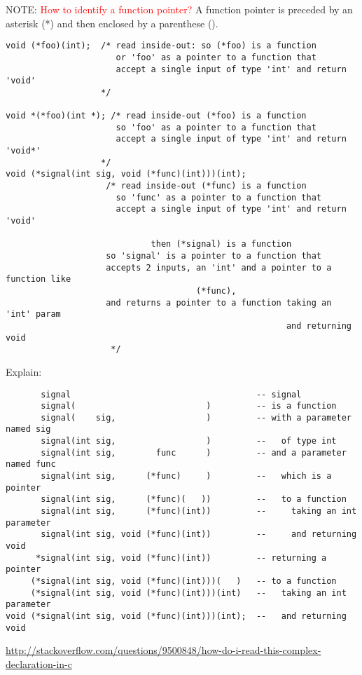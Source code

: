 NOTE: \textcolor{red}{How to identify a function pointer?} A function pointer is
preceded by an asterisk (*) and then enclosed by a parenthese ().

\begin{verbatim}
void (*foo)(int);  /* read inside-out: so (*foo) is a function
                      or 'foo' as a pointer to a function that
                      accept a single input of type 'int' and return 'void'
                   */
                   
void *(*foo)(int *); /* read inside-out (*foo) is a function 
                      so 'foo' as a pointer to a function that
                      accept a single input of type 'int' and return 'void*'
                   */                    
void (*signal(int sig, void (*func)(int)))(int); 
                    /* read inside-out (*func) is a function 
                      so 'func' as a pointer to a function that
                      accept a single input of type 'int' and return 'void'
                      
                             then (*signal) is a function
                    so 'signal' is a pointer to a function that
               	    accepts 2 inputs, an 'int' and a pointer to a function like
               	                      (*func),
               	    and returns a pointer to a function taking an 'int' param
               	                                        and returning void
               	     */                    
\end{verbatim}

Explain:
\begin{verbatim}
       signal                                     -- signal
       signal(                          )         -- is a function
       signal(    sig,                  )         -- with a parameter named sig
       signal(int sig,                  )         --   of type int
       signal(int sig,        func      )         -- and a parameter named func
       signal(int sig,      (*func)     )         --   which is a pointer
       signal(int sig,      (*func)(   ))         --   to a function
       signal(int sig,      (*func)(int))         --     taking an int parameter
       signal(int sig, void (*func)(int))         --     and returning void
      *signal(int sig, void (*func)(int))         -- returning a pointer
     (*signal(int sig, void (*func)(int)))(   )   -- to a function
     (*signal(int sig, void (*func)(int)))(int)   --   taking an int parameter
void (*signal(int sig, void (*func)(int)))(int);  --   and returning void
\end{verbatim}
\url{http://stackoverflow.com/questions/9500848/how-do-i-read-this-complex-declaration-in-c}


